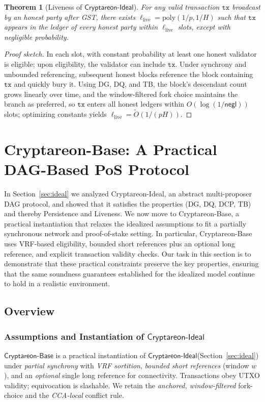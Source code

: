 \documentclass[11pt]{article}
\newtheorem{theorem}{Theorem}[section]
\newcommand{\ProjIdeal}{\ensuremath{\mathsf{Cryptareon\text{-}Ideal}}\xspace}
\newcommand{\ProjBase}{\ensuremath{\mathsf{Cryptareon\text{-}Base}}\xspace}
\newcommand{\negl}{\ensuremath{\mathsf{negl}}\xspace}
\newcommand{\tx}{\ensuremath{\mathtt{tx}}\xspace}
\begin{document}
\begin{theorem}[Liveness of \ProjIdeal]
\label{thm:ideal-liveness}
For any valid transaction $\tx$ broadcast by an honest party after GST, there exists $\ell_{\mathrm{live}}=\mathrm{poly}(1/p,1/H)$ such that $\tx$ appears in the ledger of every honest party within $\ell_{\mathrm{live}}$ slots, except with negligible probability.
\end{theorem}
\begin{proof}[Proof sketch]
In each slot, with constant probability at least one honest validator is eligible; upon eligibility, the validator can include $\tx$. Under synchrony and unbounded referencing, subsequent honest blocks reference the block containing $\tx$ and quickly bury it. Using DG, DQ, and TB, the block's descendant count grows linearly over time, and the window-filtered fork choice maintains the branch as preferred, so $\tx$ enters all honest ledgers within $O(\log(1/\negl))$ slots; optimizing constants yields $\ell_{\mathrm{live}}=\tilde{O}(1/(pH))$.
\end{proof}

\section{Cryptareon-Base: A Practical DAG-Based PoS Protocol}
\label{sec:base}
In Section~\ref{sec:ideal} we analyzed Cryptareon-Ideal, an abstract multi-proposer DAG protocol, and showed
that it satisfies the properties (DG, DQ, DCP, TB) and thereby Persistence and Liveness. We now
move to Cryptareon-Base, a practical instantiation that relaxes the idealized assumptions to fit
a partially synchronous network and proof-of-stake setting. In particular, Cryptareon-Base uses
VRF-based eligibility, bounded short references plus an optional long reference, and explicit
transaction validity checks. Our task in this section is to demonstrate that these practical
constraints preserve the key properties, ensuring that the same soundness guarantees established
for the idealized model continue to hold in a realistic environment.

\subsection{Overview}  

\subsubsection{Assumptions and Instantiation of \ProjIdeal}
\label{subsec:base-overview}
\ProjBase is a practical instantiation of \ProjIdeal (Section~\ref{sec:ideal}) under \emph{partial synchrony} with \emph{VRF sortition}, \emph{bounded short references} (window $w$), and an \emph{optional} single long reference for connectivity. Transactions obey UTXO validity; equivocation is slashable. We retain the \emph{anchored, window-filtered} fork-choice and the \emph{CCA-local} conflict rule.
\end{document}
